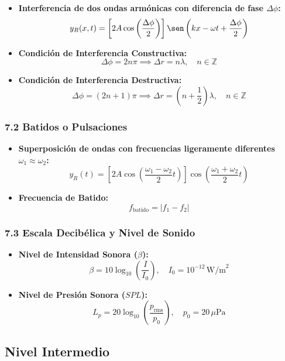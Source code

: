 \documentclass[11pt,a4paper]{article}
\begin{document}
\begin{itemize}
  \item \textbf{Interferencia de dos ondas armónicas con diferencia de fase $\Delta\phi$:}
  \[
    y_R(x, t) = \left[ 2A \cos\left(\frac{\Delta\phi}{2}\right) \right] \sen\left(kx - \omega t + \frac{\Delta\phi}{2}\right)
  \]
  \item \textbf{Condición de Interferencia Constructiva:}
  \[
    \Delta\phi = 2n\pi \implies \Delta r = n\lambda, \quad n \in \mathbb{Z}
  \]
  \item \textbf{Condición de Interferencia Destructiva:}
  \[
    \Delta\phi = (2n + 1)\pi \implies \Delta r = \left(n + \frac{1}{2}\right)\lambda, \quad n \in \mathbb{Z}
  \]
\end{itemize}

\subsubsection*{7.2 Batidos o Pulsaciones}

\begin{itemize}
  \item \textbf{Superposición de ondas con frecuencias ligeramente diferentes $\omega_1 \approx \omega_2$:}
  \[
    y_R(t) = \left[ 2A \cos\left( \frac{\omega_1 - \omega_2}{2} t \right) \right] \cos\left( \frac{\omega_1 + \omega_2}{2} t \right)
  \]
  \item \textbf{Frecuencia de Batido:}
  \[
    f_{\text{batido}} = |f_1 - f_2|
  \]
\end{itemize}

\subsubsection*{7.3 Escala Decibélica y Nivel de Sonido}

\begin{itemize}
  \item \textbf{Nivel de Intensidad Sonora ($\beta$):}
  \[
    \beta = 10 \log_{10}\left( \frac{I}{I_0} \right), \quad I_0 = 10^{-12} \, \text{W/m}^2
  \]
  \item \textbf{Nivel de Presión Sonora ($SPL$):}
  \[
    L_p = 20 \log_{10}\left( \frac{p_{\text{rms}}}{p_0} \right), \quad p_0 = 20 \, \mu\text{Pa}
  \]
\end{itemize}

\subsection*{Nivel Intermedio}
\end{document}
